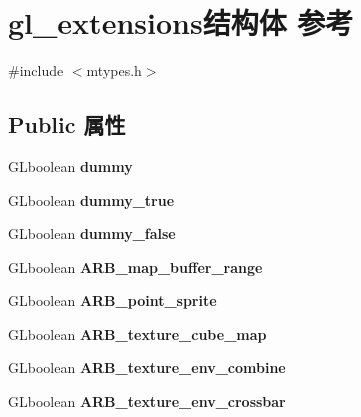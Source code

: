 \hypertarget{structgl__extensions}{}\section{gl\+\_\+extensions结构体 参考}
\label{structgl__extensions}


{\ttfamily \#include $<$mtypes.\+h$>$}

\subsection*{Public 属性}
\begin{DoxyCompactItemize}
\item 
\mbox{\label{structgl__extensions_a8d08ff97da9d42b02639096bd43fc2c1}} 
G\+Lboolean {\bfseries dummy}
\item 
\mbox{\label{structgl__extensions_ab3766cdbbd7c87421f9ef54b13491124}} 
G\+Lboolean {\bfseries dummy\+\_\+true}
\item 
\mbox{\label{structgl__extensions_a3638c9903cc0f4e65ba4bcb9cd5f5ad3}} 
G\+Lboolean {\bfseries dummy\+\_\+false}
\item 
\mbox{\label{structgl__extensions_a76f7280e3fa2a51d11fc55ae3cbbc258}} 
G\+Lboolean {\bfseries A\+R\+B\+\_\+map\+\_\+buffer\+\_\+range}
\item 
\mbox{\label{structgl__extensions_ac3a450c493ca24d0dbc3abdf0bbc951a}} 
G\+Lboolean {\bfseries A\+R\+B\+\_\+point\+\_\+sprite}
\item 
\mbox{\label{structgl__extensions_a40329e19e32049e7cf58f2bfd2c8ae82}} 
G\+Lboolean {\bfseries A\+R\+B\+\_\+texture\+\_\+cube\+\_\+map}
\item 
\mbox{\label{structgl__extensions_acc54a986abf27d74880bbd33911aeac7}} 
G\+Lboolean {\bfseries A\+R\+B\+\_\+texture\+\_\+env\+\_\+combine}
\item 
\mbox{\label{structgl__extensions_a7bb284865ce6cbf11d8f88c81919d81b}} 
G\+Lboolean {\bfseries A\+R\+B\+\_\+texture\+\_\+env\+\_\+crossbar}

\end{DoxyCompactItemize}
